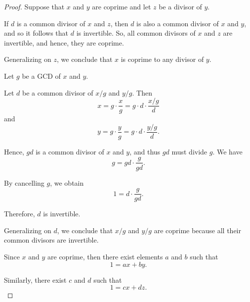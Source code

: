 \begin{proof}
   Suppose that \( x \) and \( y \) are coprime and let \( z \) be a divisor of \( y \).

  If \( d \) is a common divisor of \( x \) and \( z \), then \( d \) is also a common divisor of \( x \) and \( y \), and so it follows that \( d \) is invertible. So, all common divisors of \( x \) and \( z \) are invertible, and hence, they are coprime.

  Generalizing on \( z \), we conclude that \( x \) is coprime to any divisor of \( y \).

   Let \( g \) be a GCD of \( x \) and \( y \).

  Let \( d \) be a common divisor of \( x / g \) and \( y / g \). Then
  \begin{equation*}
    x = g \cdot \frac x g = g \cdot d \cdot \frac {x / g} d
  \end{equation*}
  and
  \begin{equation*}
    y = g \cdot \frac y g = g \cdot d \cdot \frac {y / g} d.
  \end{equation*}

  Hence, \( gd \) is a common divisor of \( x \) and \( y \), and thus \( gd \) must divide \( g \). We have
  \begin{equation*}
    g = gd \cdot \frac g {gd}.
  \end{equation*}

  By cancelling \( g \), we obtain
  \begin{equation*}
    1 = d \cdot \frac g {gd}.
  \end{equation*}

  Therefore, \( d \) is invertible.

  Generalizing on \( d \), we conclude that \( x / g \) and \( y / g \) are coprime because all their common divisors are invertible.

   Since \( x \) and \( y \) are coprime, then there exist elements \( a \) and \( b \) such that
  \begin{equation*}
    1 = ax + by.
  \end{equation*}

  Similarly, there exist \( c \) and \( d \) such that
  \begin{equation*}
    1 = cx + dz.
  \end{equation*}


\end{proof}
